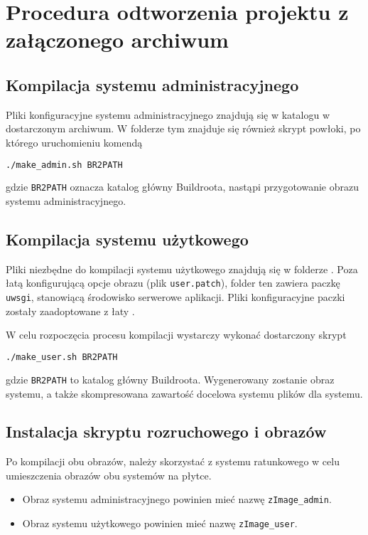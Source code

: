 \documentclass[10pt,a4paper]{article}
\begin{document}
\section{Procedura odtworzenia projektu z załączonego archiwum}

\subsection{Kompilacja systemu administracyjnego}

Pliki konfiguracyjne systemu administracyjnego znajdują się w katalogu 
w dostarczonym archiwum. W folderze tym znajduje się również skrypt powłoki, po którego
uruchomieniu komendą
\begin{lstlisting}[language=bash]
./make_admin.sh BR2PATH
\end{lstlisting}
gdzie \verb+BR2PATH+ oznacza katalog główny Buildroota, nastąpi przygotowanie obrazu systemu
administracyjnego.

\subsection{Kompilacja systemu użytkowego}

Pliki niezbędne do kompilacji systemu użytkowego znajdują się w folderze .
Poza łatą konfigurującą opcje obrazu (plik \texttt{user.patch}), folder ten zawiera paczkę
\texttt{uwsgi}, stanowiącą środowisko serwerowe aplikacji. Pliki konfiguracyjne paczki zostały
zaadoptowane z łaty \cite{uwsgi-package}.

W celu rozpoczęcia procesu kompilacji wystarczy wykonać dostarczony skrypt
\begin{lstlisting}[language=bash]
./make_user.sh BR2PATH
\end{lstlisting}
gdzie \verb+BR2PATH+ to katalog główny Buildroota. Wygenerowany zostanie obraz systemu, a także
skompresowana zawartość docelowa systemu plików dla systemu.

\subsection{Instalacja skryptu rozruchowego i obrazów}

Po kompilacji obu obrazów, należy skorzystać z systemu ratunkowego w celu umieszczenia obrazów
obu systemów na płytce.

\begin{itemize}
	\item Obraz systemu administracyjnego powinien mieć nazwę \texttt{zImage\_admin}.
	\item Obraz systemu użytkowego powinien mieć nazwę \texttt{zImage\_user}.
\end{itemize}
\end{document}
